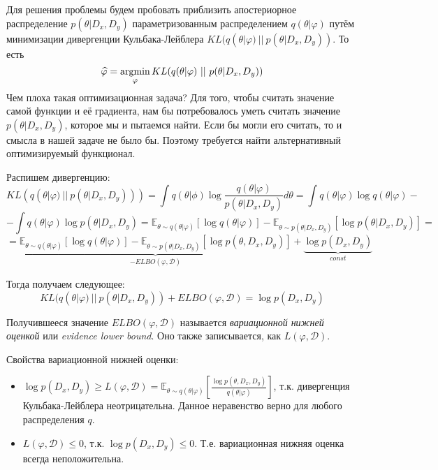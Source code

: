 Для решения проблемы будем пробовать приблизить апостериорное распределение $p(\theta | D_x, D_y)$ параметризованным распределением $q(\theta | \varphi)$ путём минимизации дивергенции Кульбака-Лейблера $KL(q(\theta | \varphi)\ ||\ p(\theta | D_x, D_y))$.
 То есть
$$\widehat{\varphi} = \operatorname*{argmin}_{\varphi} KL(q(\theta | \varphi)\ ||\ p(\theta | D_x, D_y))$$
Чем плоха такая оптимизационная задача? Для того, чтобы считать значение самой функции и её градиента, нам бы потребовалось уметь считать значение $p(\theta | D_x, D_y)$, которое мы и пытаемся найти. Если бы могли его считать, то
 и смысла в нашей задаче не было бы. Поэтому требуется найти альтернативный оптимизируемый функционал.

Распишем дивергенцию:
$$KL(q(\theta | \varphi)\ ||\ p(\theta | D_x, D_y))) = \int q(\theta | \phi) \log \frac{q(\theta | \varphi)}{p(\theta | D_x, D_y)} d\theta = \int q(\theta | \varphi) \log q(\theta | \varphi)-$$
$$-\int q(\theta | \varphi) \log p(\theta | D_x, D_y) = \mathbb{E}_{\theta \sim q(\theta | \varphi)} [\log q(\theta | \varphi)] - \mathbb{E}_{\theta \sim p(\theta | D_x, D_y)}[\log p(\theta | D_x, D_y)]=$$
$$=\underbrace{\mathbb{E}_{\theta \sim q(\theta | \varphi)} [\log q(\theta | \varphi)] - \mathbb{E}_{\theta \sim p(\theta | D_x, D_y)}[\log p(\theta, D_x, D_y)] }_{-ELBO(\varphi, \mathcal{D})} + \underbrace{\log p(D_x, D_y)}_{const}$$

Тогда получаем следующее:
$$KL(q(\theta | \varphi)\ ||\ p(\theta | D_x, D_y)) + ELBO(\varphi, \mathcal{D}) = \log p(D_x, D_y)$$

Получившееся значение $ELBO(\varphi, \mathcal{D})$ называется \textit{вариационной нижней оценкой} или \textit{evidence lower bound}. Оно также записывается,
 как $L(\varphi, \mathcal{D})$.

Свойства вариационной нижней оценки:
\begin{itemize}
    \item $\log p(D_x, D_y) \ge L(\varphi, \mathcal{D}) = \mathbb{E}_{\theta \sim q(\theta | \varphi)} [\frac{\log p(\theta, D_x, D_y)}{q(\theta | \varphi)}]$, т.к. дивергенция Кульбака-Лейблера неотрицательна. Данное неравенство верно для любого распределения $q$.
    \item $L(\varphi, \mathcal{D}) \le 0$, т.к. $\log p(D_x, D_y) \le 0$. Т.е. вариационная нижняя оценка всегда неположительна.
\end{itemize}

